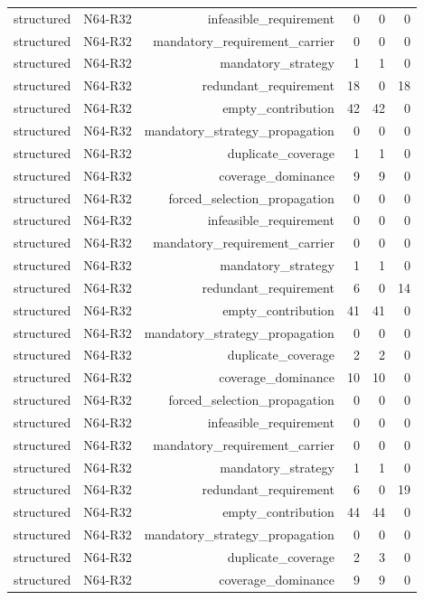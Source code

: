 {\begin{longtable}{lrrrrr}
structured & N64-R32 & infeasible\_requirement & 0 & 0 & 0 \\
structured & N64-R32 & mandatory\_requirement\_carrier & 0 & 0 & 0 \\
structured & N64-R32 & mandatory\_strategy & 1 & 1 & 0 \\
structured & N64-R32 & redundant\_requirement & 18 & 0 & 18 \\
structured & N64-R32 & empty\_contribution & 42 & 42 & 0 \\
structured & N64-R32 & mandatory\_strategy\_propagation & 0 & 0 & 0 \\
structured & N64-R32 & duplicate\_coverage & 1 & 1 & 0 \\
structured & N64-R32 & coverage\_dominance & 9 & 9 & 0 \\
structured & N64-R32 & forced\_selection\_propagation & 0 & 0 & 0 \\
structured & N64-R32 & infeasible\_requirement & 0 & 0 & 0 \\
structured & N64-R32 & mandatory\_requirement\_carrier & 0 & 0 & 0 \\
structured & N64-R32 & mandatory\_strategy & 1 & 1 & 0 \\
structured & N64-R32 & redundant\_requirement & 6 & 0 & 14 \\
structured & N64-R32 & empty\_contribution & 41 & 41 & 0 \\
structured & N64-R32 & mandatory\_strategy\_propagation & 0 & 0 & 0 \\
structured & N64-R32 & duplicate\_coverage & 2 & 2 & 0 \\
structured & N64-R32 & coverage\_dominance & 10 & 10 & 0 \\
structured & N64-R32 & forced\_selection\_propagation & 0 & 0 & 0 \\
structured & N64-R32 & infeasible\_requirement & 0 & 0 & 0 \\
structured & N64-R32 & mandatory\_requirement\_carrier & 0 & 0 & 0 \\
structured & N64-R32 & mandatory\_strategy & 1 & 1 & 0 \\
structured & N64-R32 & redundant\_requirement & 6 & 0 & 19 \\
structured & N64-R32 & empty\_contribution & 44 & 44 & 0 \\
structured & N64-R32 & mandatory\_strategy\_propagation & 0 & 0 & 0 \\
structured & N64-R32 & duplicate\_coverage & 2 & 3 & 0 \\
structured & N64-R32 & coverage\_dominance & 9 & 9 & 0 \\

\end{longtable}}
